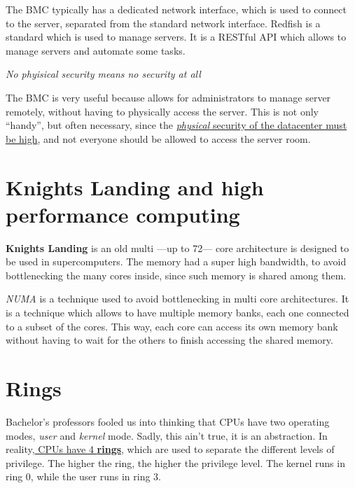 
The BMC typically has a dedicated network interface, which is used to connect to the server, separated from the standard network interface.
Redfish is a standard which is used to manage servers. It is a RESTful API which allows to manage servers and automate some tasks.


\begin{center}
   \textit{No phyisical security means no security at all}
\end{center}
The BMC is very useful because allows for administrators to manage server remotely, without having to physically access the server.
This is not only ``handy'', but often necessary, since the \ul{\textit{physical} security of the datacenter must be high}, and not everyone should be allowed to access the server room.


\section{Knights Landing and high performance computing}
\textbf{Knights Landing} is an old multi ---up to 72--- core architecture is designed to be used in supercomputers. The memory had a super high bandwidth, to avoid bottlenecking the many cores inside, since such memory is shared among them.

\textit{NUMA} is a technique used to avoid bottlenecking in multi core architectures. It is a technique which allows to have multiple memory banks, each one connected to a subset of the cores. This way, each core can access its own memory bank without having to wait for the others to finish accessing the shared memory.



\section{Rings}
Bachelor's professors fooled us into thinking that CPUs have two operating modes, \textit{user} and \textit{kernel} mode. Sadly, this ain't true, it is an abstraction. In reality,\ul{ CPUs have 4 \textbf{rings}}, which are used to separate the different levels of privilege. The higher the ring, the higher the privilege level.
The kernel runs in ring 0, while the user runs in ring 3.


